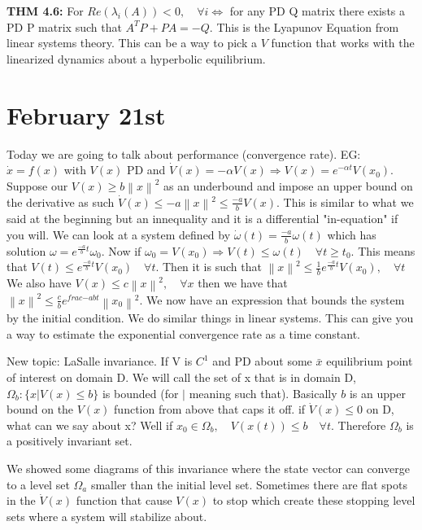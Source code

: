\documentclass[11pt]{article}
\newcommand{\norm}[1]{\left\lVert#1\right\rVert}
\begin{document}
\textbf{THM 4.6:} For $Re(\lambda_i (A))<0, \quad \forall i \Leftrightarrow$ for any PD Q matrix there exists a PD P matrix such that $A^TP + PA = -Q$. This is the Lyapunov Equation from linear systems theory. This can be a way to pick a $V$ function that works with the linearized dynamics about a hyperbolic equilibrium. 




\section{February 21st}
Today we are going to talk about performance (convergence rate). EG: $\dot{x}=f(x)$ with $V(x)$  PD and $\dot{V}(x) = -\alpha V(x) \Rightarrow V(x) =e^{-\alpha t}V(x_0)$. Suppose our $V(x) \geq b\norm{x}^2$ as an underbound and impose an upper bound on the derivative as such $\dot{V}(x) \leq -a \norm{x}^2 \leq \frac{-a}{b}V(x)$. This is similar to what we said at the beginning but an innequality and it is a differential "in-equation" if you will. We can look at a system defined by $\dot{\omega}(t)= \frac{-a}{b}\omega(t)$ which has solution $\omega = e^{\frac{-a}{b}t} \omega_0$. Now if $\omega_0 = V(x_0) \Rightarrow V(t) \leq \omega(t) \quad \forall t\geq t_0$. This means that $V(t) \leq e^{\frac{-a}{b}t} V(x_0) \quad \forall t$. Then it is such that $\norm{x}^2 \leq \frac{1}{b} e^{\frac{-a}{b}t}V(x_0), \quad \forall t$ We also have $V(x)\leq c \norm{x}^2,\quad \forall x$ then  we have that $\norm{x}^2 \leq \frac{c}{b}e^{frac{-a}{b}t}\norm{x_0}^2$. We now have an expression that bounds the system by the initial condition. We do similar things in linear systems. This can give you a way to estimate the exponential convergence rate as a time constant.

New topic: LaSalle invariance. If V is $C^1$ and PD about some $\bar{x}$ equilibrium point of interest on domain D. We will call the set of x that is in domain D,  $\Omega_b : \{x \rvert V(x) \leq b \}$ is bounded (for $\rvert$ meaning such that). Basically $b$ is an upper bound on the $V(x)$ function from above that caps it off. if $\dot{V}(x) \leq 0 $ on D, what can we say about x? Well if $x_0 \in \Omega_b, \quad V(x(t)) \leq b \quad \forall t$. Therefore $\Omega_b$ is a positively invariant set.

We showed some diagrams of this invariance where the state vector can converge to a level set $\Omega_a$ smaller than the initial level set. Sometimes there are flat spots in the $\dot{V}(x)$ function that cause $V(x)$ to stop which create these stopping level sets where a system will stabilize about. 
\end{document}
